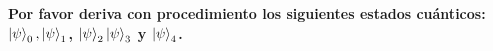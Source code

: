 \textbf{Por favor deriva con procedimiento los siguientes estados cuánticos:
$\ket{\psi}_0, \ket{\psi}_1$, $\ket{\psi}_2\ket{\psi}_3$ y $\ket{\psi}_4$.}\vspace{.2cm}

\textcolor{bibi}{}
\begin{quote}
\end{quote}
